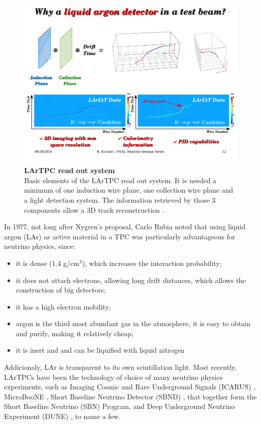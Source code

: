\begin{figure}[h!]
	\begin{center}
		\includegraphics[scale=0.6]{Figures/Acciarri_fig2.pdf}
		\caption[LArTPC read out system]{ {\textbf{LArTPC read out system}} \\ Basic elements of the LArTPC read out system. It is needed a minimum of one induction wire plane, one collection wire plane and a light detection system. The information retrieved by those 3 components allow a 3D track reconstruction \cite{Acciarri_presentation}.}
		\label{lartpc_readout}	
	\end{center}
\end{figure}

\newpage
In 1977, not long after Nygren's proposal, Carlo Rubia noted that using liquid argon (LAr) as active material in a TPC was particularly advantageous for neutrino physics, since:
\begin{itemize}
	\item it is dense (1.4 g/cm$^3$), which increases the interaction probability;
 	\item it does not attach electrons, allowing long drift distances, which allows the construction of big detectors;
  	\item it has a high electron mobility;
   	\item argon is the third most abundant gas in the atmosphere, it is easy to obtain and purify, making it relatively cheap;
  	\item it is inert and and can be liquified with liquid nitrogen \cite{Rubia_ANewConcept}
\end{itemize}
Addicionaly, LAr is transparent to its own scintillation light. 
%
Most recently, LArTPCs have been the technology of choice of many neutrino physics experiments, such as Imaging Cosmic and Rare Underground Signals (ICARUS) \cite{ICARUS_proposal}, MicroBooNE \cite{microboone_proposal}, Short Baseline Neutrino Detector (SBND) \cite{SBND}, that together form the Short Baseline Neutrino (SBN) Program, and Deep Underground Neutrino Experiment (DUNE) \cite{dune_snowmass_22}, to name a few.
%

